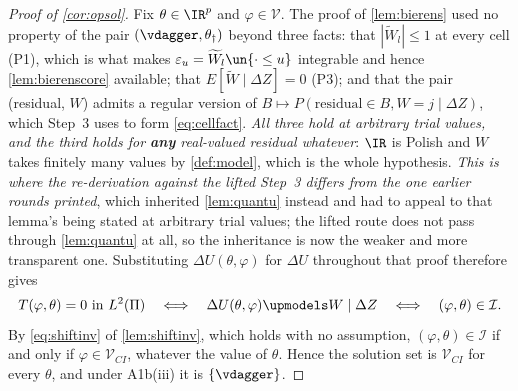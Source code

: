 \begin{proof}[Proof of \cref{cor:opsol}]
Fix $\theta\in\IR^{p}$ and $\varphi\in\mathcal V$. The proof of \cref{lem:bierens} used no property of
the pair $(\vdagger,\theta_\dagger)$ beyond three facts: that $|\widetilde W_l|\le1$ at every cell
(P1), which is what makes $\varepsilon_u=\widetilde W_l\un\{\cdot\le u\}$ integrable and hence
\cref{lem:bierenscore} available; that $E[\widetilde W\mid\Delta Z]=0$ (P3); and that the pair
(residual, $W$) admits a regular version of $B\mapsto P(\text{residual}\in B,W=j\mid\Delta Z)$, which
Step~3 uses to form \eqref{eq:cellfact}.
\emph{All three hold at arbitrary trial values, and the third holds for \textbf{any} real-valued
residual whatever}: $\IR$ is Polish and $W$ takes finitely many values by \cref{def:model}, which is the
whole hypothesis. \emph{This is where the re-derivation against the lifted Step~3 differs from the one
earlier rounds printed}, which inherited \cref{lem:quantu} instead and had to appeal to that lemma's
being stated at arbitrary trial values; the lifted route does not pass through \cref{lem:quantu} at all,
so the inheritance is now the weaker and more transparent one.
Substituting $\Delta U(\theta,\varphi)$ for $\Delta U$ throughout that proof therefore gives
\[
T(\varphi,\theta)=0\ \text{in }L^{2}(\Pi)
\quad\Longleftrightarrow\quad
\Delta U(\theta,\varphi)\upmodels W\mid\Delta Z
\quad\Longleftrightarrow\quad
(\varphi,\theta)\in\mathcal I .
\]
By \eqref{eq:shiftinv} of \cref{lem:shiftinv}, which holds with no assumption, $(\varphi,\theta)\in\mathcal I$
if and only if $\varphi\in\mathcal V_{CI}$, whatever the value of $\theta$. Hence the solution set is
$\mathcal V_{CI}$ for every $\theta$, and under A1b(iii) it is $\{\vdagger\}$.
\end{proof}

